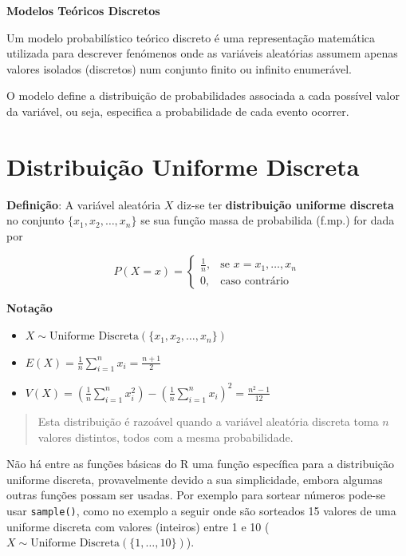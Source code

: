 \documentclass[
]{book}
\providecommand{\tightlist}{%
  \setlength{\itemsep}{0pt}\setlength{\parskip}{0pt}}
\begin{document}
\textbf{Modelos Teóricos Discretos}

Um modelo probabilístico teórico discreto é uma representação matemática utilizada para descrever fenómenos onde as variáveis aleatórias assumem apenas valores isolados (discretos) num conjunto finito ou infinito enumerável.

O modelo define a distribuição de probabilidades associada a cada possível valor da variável, ou seja, especifica a probabilidade de cada evento ocorrer.

\section{Distribuição Uniforme Discreta}\label{distribuiuxe7uxe3o-uniforme-discreta}

\textbf{Definição}: A variável aleatória \(X\) diz-se ter \textbf{distribuição uniforme discreta} no conjunto \(\{x_1, x_2, \dots, x_n\}\) se sua função massa de probabilida (f.mp.) for dada por

\[
P(X = x) = 
\begin{cases}
\frac{1}{n}, & \text{se } x = x_1, \dots, x_n \\
0, & \text{caso contrário}
\end{cases}
\]

\textbf{Notação}

\begin{itemize}
\tightlist
\item
  \(X \sim \text{Uniforme Discreta} (\{x_1, x_2, \dots, x_n\})\)
\item
  \(E(X) = \frac{1}{n} \sum_{i=1}^{n} x_i = \frac{n+1}{2}\)
\item
  \(V(X) = \left(\frac{1}{n} \sum_{i=1}^{n} x_i^2\right) - \left(\frac{1}{n} \sum_{i=1}^{n} x_i \right)^2 = \frac{n^2 - 1}{12}\)
\end{itemize}

\begin{quote}
Esta distribuição é razoável quando a variável aleatória discreta toma \(n\) valores distintos, todos com a mesma probabilidade.
\end{quote}

Não há entre as funções básicas do R uma função específica para a distribuição uniforme discreta, provavelmente devido a sua simplicidade, embora algumas outras funções possam ser usadas. Por exemplo para sortear números pode-se usar \texttt{sample()}, como no exemplo a seguir onde são sorteados 15 valores de uma uniforme discreta com valores (inteiros) entre 1 e 10 (\(X\sim \text{Uniforme Discreta}(\{1,\ldots,10\})\)).
\end{document}

